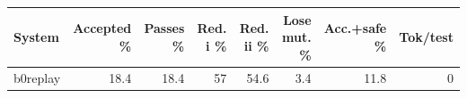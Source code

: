 \begin{tabular}{lrrrrrrr}
\toprule
System & Accepted \% & Passes \% & Red. i \% & Red. ii \% & Lose mut. \% & Acc.+safe \% & Tok/test \\
\midrule
b0replay & 18.4 & 18.4 & 57 & 54.6 & 3.4 & 11.8 & 0 \\
\bottomrule
\end{tabular}
